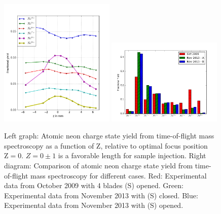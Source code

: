 \begin{figure}
	\centering
		\includegraphics[width=0.49\textwidth]{images/Focus-z-scan.png}
		\includegraphics[width=0.49\textwidth]{images/Focus-Fractional-Yield.png}
	\caption[Focal spot analysis using a time-of-flight ion spectrometer.]{Left graph: Atomic neon charge state yield from time-of-flight mass spectroscopy as a function of Z, relative to optimal focus position $\text{Z}=0$. $Z=0\pm1$ is a favorable length for sample injection. Right diagram: Comparison of atomic neon charge state yield from time-of-flight mass spectroscopy for different cases. Red: Experimental data from October 2009 with 4 blades (S) opened. Green: Experimental data from November 2013 with (S) closed. Blue: Experimental data from November 2013 with (S) opened.}
	\label{fig:Focus-z-scan}
\end{figure}
